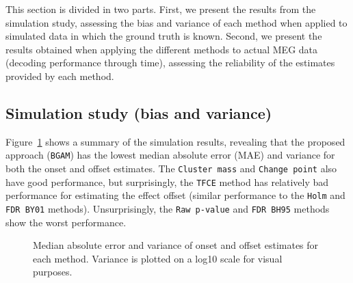\documentclass[
  doc,
  floatsintext,
  longtable,
  a4paper,
  nolmodern,
  notxfonts,
  notimes,
  donotrepeattitle,
  colorlinks=true,linkcolor=blue,citecolor=blue,urlcolor=blue]{apa7}
\begin{document}
This section is divided in two parts. First, we present the results from
the simulation study, assessing the bias and variance of each method
when applied to simulated data in which the ground truth is known.
Second, we present the results obtained when applying the different
methods to actual MEG data (decoding performance through time),
assessing the reliability of the estimates provided by each method.

\subsection{Simulation study (bias and
variance)}\label{simulation-study-bias-and-variance}

Figure~\ref{fig-simulation-results} shows a summary of the simulation
results, revealing that the proposed approach (\texttt{BGAM}) has the
lowest median absolute error (MAE) and variance for both the onset and
offset estimates. The \texttt{Cluster\ mass} and \texttt{Change\ point}
also have good performance, but surprisingly, the \texttt{TFCE} method
has relatively bad performance for estimating the effect offset (similar
performance to the \texttt{Holm} and \texttt{FDR\ BY01} methods).
Unsurprisingly, the \texttt{Raw\ p-value} and \texttt{FDR\ BH95} methods
show the worst performance.

\begin{figure}[!htb]

\caption{\label{fig-simulation-results}Median absolute error and
variance of onset and offset estimates for each method. Variance is
plotted on a log10 scale for visual purposes.}


\end{figure}%
\end{document}
